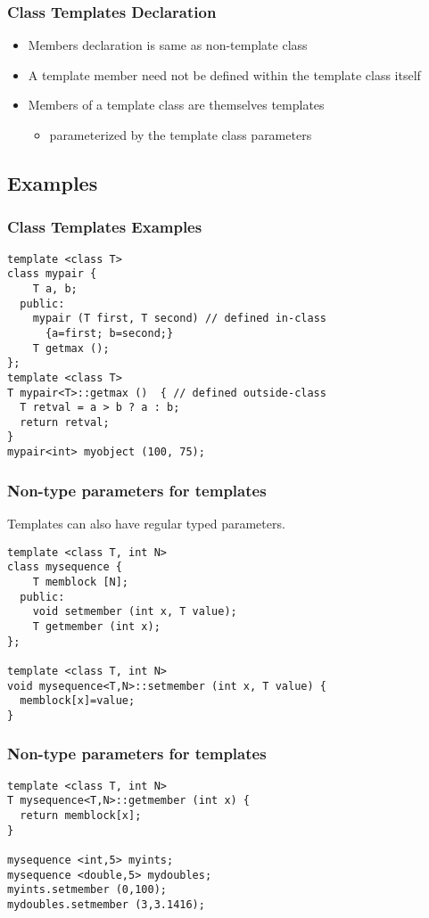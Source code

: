 \documentclass{beamer}
\begin{document}
\begin{frame}
\frametitle{Class Templates Declaration}

\begin{itemize}
\item Members declaration is same as non-template class
\item A template member need not be defined within the template class itself
\item Members of a template class are themselves templates
    \begin{itemize} 
    \item parameterized by the template class parameters
    \end{itemize}
\end{itemize}
\end{frame}

\subsection{Examples}

\begin{frame}[fragile]
\frametitle{Class Templates Examples}
\begin{lstlisting}
template <class T>
class mypair {
    T a, b;
  public:
    mypair (T first, T second) // defined in-class
      {a=first; b=second;}
    T getmax ();
};
template <class T>
T mypair<T>::getmax ()  { // defined outside-class
  T retval = a > b ? a : b;
  return retval;
}
mypair<int> myobject (100, 75); 

\end{lstlisting}

\end{frame}


\begin{frame}[fragile]
\frametitle{Non-type parameters for templates}
Templates can also have regular typed parameters.
\begin{lstlisting}
template <class T, int N>
class mysequence {
    T memblock [N];
  public:
    void setmember (int x, T value);
    T getmember (int x);
};

template <class T, int N>
void mysequence<T,N>::setmember (int x, T value) {
  memblock[x]=value;
}

\end{lstlisting}
\end{frame}

\begin{frame}[fragile]
\frametitle{Non-type parameters for templates}
\begin{lstlisting}
template <class T, int N>
T mysequence<T,N>::getmember (int x) {
  return memblock[x];
}

mysequence <int,5> myints;
mysequence <double,5> mydoubles;
myints.setmember (0,100);
mydoubles.setmember (3,3.1416);

\end{lstlisting}
\end{frame}
\end{document}
